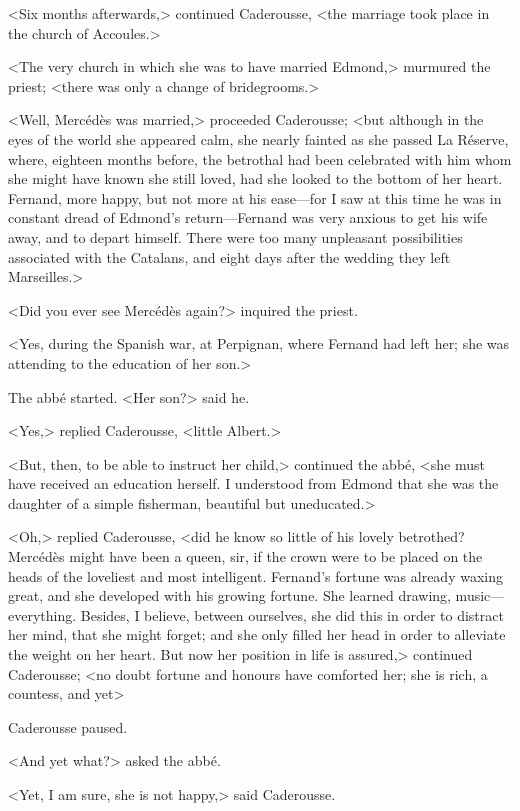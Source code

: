  <Six months afterwards,> continued Caderousse, <the marriage took place in the church of Accoules.> 

 <The very church in which she was to have married Edmond,> murmured the priest; <there was only a change of bridegrooms.> 

 <Well, Mercédès was married,> proceeded Caderousse; <but although in the eyes of the world she appeared calm, she nearly fainted as she passed La Réserve, where, eighteen months before, the betrothal had been celebrated with him whom she might have known she still loved, had she looked to the bottom of her heart. Fernand, more happy, but not more at his ease—for I saw at this time he was in constant dread of Edmond's return—Fernand was very anxious to get his wife away, and to depart himself. There were too many unpleasant possibilities associated with the Catalans, and eight days after the wedding they left Marseilles.> 

 <Did you ever see Mercédès again?> inquired the priest. 

 <Yes, during the Spanish war, at Perpignan, where Fernand had left her; she was attending to the education of her son.> 

 The abbé started. <Her son?> said he. 

 <Yes,> replied Caderousse, <little Albert.> 

 <But, then, to be able to instruct her child,> continued the abbé, <she must have received an education herself. I understood from Edmond that she was the daughter of a simple fisherman, beautiful but uneducated.> 

 <Oh,> replied Caderousse, <did he know so little of his lovely betrothed? Mercédès might have been a queen, sir, if the crown were to be placed on the heads of the loveliest and most intelligent. Fernand's fortune was already waxing great, and she developed with his growing fortune. She learned drawing, music—everything. Besides, I believe, between ourselves, she did this in order to distract her mind, that she might forget; and she only filled her head in order to alleviate the weight on her heart. But now her position in life is assured,> continued Caderousse; <no doubt fortune and honours have comforted her; she is rich, a countess, and yet\longdash> 

 Caderousse paused. 

 <And yet what?> asked the abbé. 

 <Yet, I am sure, she is not happy,> said Caderousse. 

